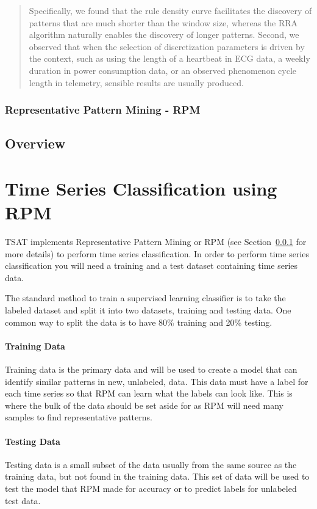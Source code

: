\documentclass[letterpaper, 12pt]{article}
\begin{document}
\begin{quote}
	Specifically, we found that the rule density curve facilitates the discovery of patterns that are much shorter than the window size, whereas the RRA algorithm naturally enables the discovery of longer patterns. Second, we observed that when the selection of discretization parameters is driven by the context, such as using the length of a heartbeat in ECG data, a weekly duration in power consumption data, or an observed phenomenon cycle length in telemetry, sensible results are usually produced.
\end{quote}


\subsubsection{Representative Pattern Mining - RPM}
\label{RPMOverview}



\subsection{Overview}

\section{Time Series Classification using RPM}
TSAT implements Representative Pattern Mining or RPM  (see Section~\ref{RPMOverview} for more details) to perform time series classification.  In order to perform time series classification you will need a training and a test dataset containing time series data.

The standard method to train a supervised learning classifier is to take the labeled dataset and split it into two datasets, training and testing data.  One common way to split the data is to have 80\% training and 20\% testing.  

\paragraph{Training Data}
Training data is the primary data and will be used to create a model that can identify similar patterns in new, unlabeled, data. This data must have a label for each time series so that RPM can learn what the labels can look like. This is where the bulk of the data should be set aside for as RPM will need many samples to find representative patterns.

\paragraph{Testing Data}
Testing data is a small subset of the data usually from the same source as the training data, but not found in the training data. This set of data will be used to test the model that RPM made for accuracy or to predict labels for unlabeled test data.
\end{document}
